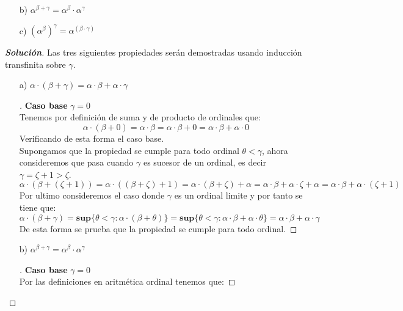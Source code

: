 \documentclass[11pt]{article}
\numberwithin{equation}{section}
\numberwithin{figure}{section}
\begin{document}
\begin{enumerate}
\begin{itemize}
        \item[b)] $\alpha^{\beta+\gamma}=\alpha^{\beta}\cdot\alpha^{\gamma}$
        \item[c)] $(\alpha^{\beta})^{\gamma}=\alpha^{(\beta\cdot\gamma)}$
    \end{itemize}
    \begin{proof}[\textbf{Solución}]
    Las tres siguientes propiedades serán demostradas usando inducción transfinita sobre $\gamma$.
    \begin{itemize}
        \item[a)] $\alpha\cdot(\beta+\gamma)=\alpha\cdot\beta+\alpha\cdot\gamma$
        \begin{proof}[\unskip\nopunct]
        \textbf{Caso base} $\gamma=0$\\
        Tenemos por definición de suma y de producto de ordinales que:
            \begin{equation*}
              \alpha\cdot(\beta+0)=\alpha\cdot\beta=\alpha\cdot\beta+0=\alpha\cdot\beta+\alpha\cdot0  
            \end{equation*}
        Verificando de esta forma el caso base.\\
        Supongamos que la propiedad se cumple para todo ordinal $\theta<\gamma$, ahora consideremos que pasa cuando $\gamma$ es sucesor de un ordinal, es decir $\gamma=\zeta+1>\zeta$.
        \begin{equation*}
        \alpha\cdot(\beta+(\zeta+1))=\alpha\cdot((\beta+\zeta)+1)=\alpha\cdot(\beta+\zeta)+\alpha=\alpha\cdot\beta+\alpha\cdot\zeta+\alpha=\alpha\cdot\beta+\alpha\cdot(\zeta+1)
        \end{equation*}
        Por ultimo consideremos el caso donde $\gamma$ es un ordinal limite y por tanto se tiene que:
        \begin{equation*}
        \alpha\cdot(\beta+\gamma)=\textbf{sup}\{\theta<\gamma:\alpha\cdot(\beta+\theta)\}=\textbf{sup}\{\theta<\gamma:\alpha\cdot\beta+\alpha\cdot\theta\}=\alpha\cdot\beta+\alpha\cdot\gamma    
        \end{equation*}
        De esta forma se prueba que la propiedad se cumple para todo ordinal.
        \end{proof}
        \item[b)] $\alpha^{\beta+\gamma}=\alpha^{\beta}\cdot\alpha^{\gamma}$
        \begin{proof}[\unskip\nopunct]
        \textbf{Caso base} $\gamma=0$\\
        Por las definiciones en aritmética ordinal tenemos que:

\end{proof}
\end{itemize}
\end{proof}
\end{enumerate}
\end{document}
